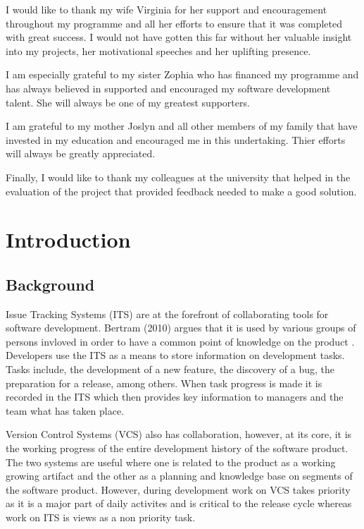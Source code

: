 \documentclass{mproj}
\begin{document}
I would like to thank my wife Virginia for her support and encouragement throughout my programme and all her efforts to ensure that it was completed with great success. I would not have gotten this far without her valuable insight into my projects, her motivational speeches and her uplifting presence.

I am especially grateful to my sister Zophia who has financed my programme and has always believed in supported and encouraged my software development talent. She will always be one of my greatest supporters.

I am grateful to my mother Joslyn and all other members of my family that have invested in my education and encouraged me in this undertaking. Thier efforts will always be greatly appreciated.

Finally, I would like to thank my colleagues at the university that helped in the evaluation of the project that provided feedback needed to make a good solution.

\tableofcontents




\chapter{Introduction}\label{intro}

\section{Background}
Issue Tracking Systems (ITS) are at the forefront of collaborating tools for software development. Bertram (2010) argues that it is used by various groups of persons invloved in order to have a common point of knowledge on the product \cite{Bertram:2010}. Developers use the ITS as a means to store information on development tasks. Tasks include, the development of a new feature, the discovery of a bug, the preparation for a release, among others. When task progress is made it is recorded in the ITS which then provides key information to managers and the team what has taken place.

Version Control Systems (VCS) also has collaboration, however, at its core, it is the working progress of the entire development history of the software product. The two systems are useful where one is related to the product as a working growing artifact and the other as a planning and knowledge base on segments of the software product. However, during development work on VCS takes priority as it is a major part of daily activites and is critical to the release cycle whereas work on ITS is views as a non priority task.
\end{document}
